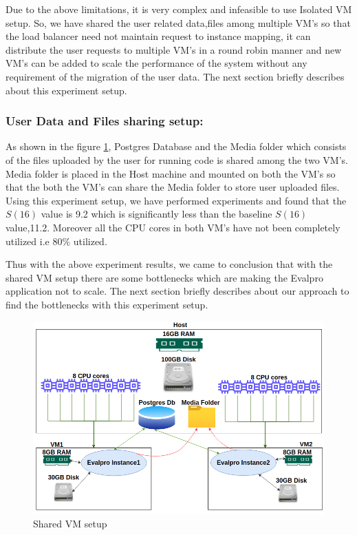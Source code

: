 \documentclass[sigconf]{acmart}
\begin{document}
Due to the above limitations, it is very complex and infeasible to use Isolated VM setup. So, we have shared the user related data,files among multiple VM's so that the load balancer need not maintain request to instance mapping, it can distribute the user requests to multiple VM's in a round robin manner and new VM's can be added to scale the performance of the system without any requirement of the migration of the user data. The next section briefly describes about this experiment setup.
\subsubsection{User Data and Files sharing setup:}
As shown in the figure \ref{shared_vm}, Postgres Database  and the Media folder which consists of the files uploaded by the user for running code is shared among the two VM's. Media folder is placed in the Host machine and mounted on both the VM's so that the both the VM's can share the Media folder to store user uploaded files. Using this experiment setup, we have performed experiments and found that the  $S(16)$ value is 9.2 which is significantly less than the baseline $S(16)$ value,11.2. Moreover all the CPU cores in both VM's have not been completely utilized i.e 80\% utilized.
\par
Thus with the above experiment results, we came to conclusion that with the shared VM setup there are some bottlenecks which are making the Evalpro application not to scale. The next section briefly describes about our approach to find the bottlenecks with this experiment setup.
\begin{figure}[!htb]
  \centering
  \includegraphics[width=\linewidth]{Pictures/shared_vm.png}
  \caption{Shared VM setup}
  \label{shared_vm}
\end{figure}
\end{document}
